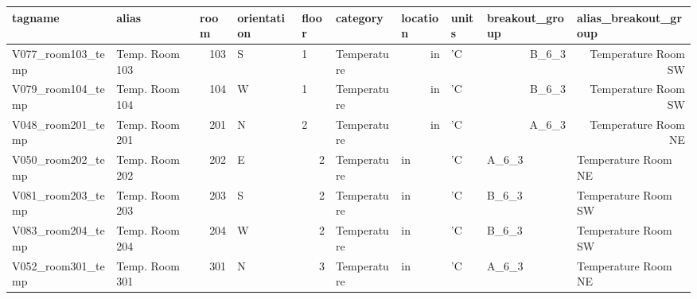 \begin{landscape}
\leavevmode
\newline
\begin{table}[htbp]
  \centering
   \scriptsize
    \begin{tabular}{|l|l|r|l|l|l|r|l|r|r|}
    \hline
    \rowcolor[rgb]{ 0,  0,  0} \textcolor[rgb]{ 1,  1,  1}{\textbf{tagname}} & \textcolor[rgb]{ 1,  1,  1}{\textbf{alias}} & \multicolumn{1}{l|}{\textcolor[rgb]{ 1,  1,  1}{\textbf{room}}} & \textcolor[rgb]{ 1,  1,  1}{\textbf{orientation}} & \textcolor[rgb]{ 1,  1,  1}{\textbf{floor}} & \textcolor[rgb]{ 1,  1,  1}{\textbf{category}} & \multicolumn{1}{l|}{\textcolor[rgb]{ 1,  1,  1}{\textbf{location}}} & \textcolor[rgb]{ 1,  1,  1}{\textbf{units}} & \multicolumn{1}{l|}{\textcolor[rgb]{ 1,  1,  1}{\textbf{breakout\_group}}} & \multicolumn{1}{l|}{\textcolor[rgb]{ 1,  1,  1}{\textbf{alias\_breakout\_group}}} \bigstrut\\
    \hline
    \rowcolor[rgb]{ .851,  .851,  .851} V077\_room103\_temp & Temp. Room 103 & 103  & S    & 1    & Temperature & in   & 'C   & B\_6\_3 & Temperature Room SW \bigstrut\\
    \hline
    V079\_room104\_temp & Temp. Room 104 & 104  & W    & 1    & Temperature & in   & 'C   & B\_6\_3 & Temperature Room SW \bigstrut\\
    \hline
    \rowcolor[rgb]{ .851,  .851,  .851} V048\_room201\_temp & Temp. Room 201 & 201  & N    & 2    & Temperature & in   & 'C   & A\_6\_3 & Temperature Room NE \bigstrut\\
    \hline
    \rowcolor[rgb]{ .851,  .851,  .851} V050\_room202\_temp & Temp. Room 202 & 202  & E    & \multicolumn{1}{r|}{2} & Temperature & \multicolumn{1}{l|}{in} & 'C   & \multicolumn{1}{l|}{A\_6\_3} & \multicolumn{1}{l|}{Temperature Room NE} \bigstrut\\
    \hline
    V081\_room203\_temp & Temp. Room 203 & 203  & S    & \multicolumn{1}{r|}{2} & Temperature & \multicolumn{1}{l|}{in} & 'C   & \multicolumn{1}{l|}{B\_6\_3} & \multicolumn{1}{l|}{Temperature Room SW} \bigstrut\\
    \hline
    \rowcolor[rgb]{ .851,  .851,  .851} V083\_room204\_temp & Temp. Room 204 & 204  & W    & \multicolumn{1}{r|}{2} & Temperature & \multicolumn{1}{l|}{in} & 'C   & \multicolumn{1}{l|}{B\_6\_3} & \multicolumn{1}{l|}{Temperature Room SW} \bigstrut\\
    \hline
    V052\_room301\_temp & Temp. Room 301 & 301  & N    & \multicolumn{1}{r|}{3} & Temperature & \multicolumn{1}{l|}{in} & 'C   & \multicolumn{1}{l|}{A\_6\_3} & \multicolumn{1}{l|}{Temperature Room NE} \bigstrut\\

\end{tabular}
\end{table}
\end{landscape}
